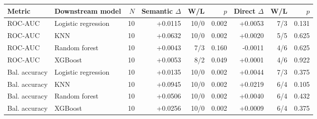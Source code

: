 \begin{tabular}{llrrrrrrr}
\toprule
Metric & Downstream model & $N$ & Semantic $\Delta$ & W/L & $p$ & Direct $\Delta$ & W/L & $p$ \\
\midrule
ROC-AUC & Logistic regression & 10 & +0.0115 & 10/0 & 0.002 & +0.0053 & 7/3 & 0.131 \\
ROC-AUC & KNN & 10 & +0.0632 & 10/0 & 0.002 & +0.0020 & 5/5 & 0.625 \\
ROC-AUC & Random forest & 10 & +0.0043 & 7/3 & 0.160 & -0.0011 & 4/6 & 0.625 \\
ROC-AUC & XGBoost & 10 & +0.0053 & 8/2 & 0.049 & +0.0001 & 4/6 & 0.922 \\
\midrule
Bal. accuracy & Logistic regression & 10 & +0.0135 & 10/0 & 0.002 & +0.0044 & 7/3 & 0.375 \\
Bal. accuracy & KNN & 10 & +0.0945 & 10/0 & 0.002 & +0.0219 & 6/4 & 0.105 \\
Bal. accuracy & Random forest & 10 & +0.0506 & 10/0 & 0.002 & +0.0040 & 6/4 & 0.432 \\
Bal. accuracy & XGBoost & 10 & +0.0256 & 10/0 & 0.002 & +0.0009 & 6/4 & 0.375 \\
\bottomrule
\end{tabular}
